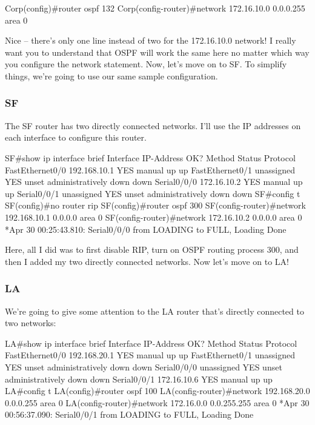 \begin{cli}
Corp(config)#router ospf 132
Corp(config-router)#network 172.16.10.0 0.0.0.255 area 0
\end{cli}

Nice -- there's only one line instead of two for the 172.16.10.0 network!
I really want you to understand that OSPF will work the same here no
matter which way you configure the network statement. Now, let's move on
to SF. To simplify things, we're going to use our same sample
configuration.

\subsubsection{SF}

The SF router has two directly connected networks. I'll use the IP
addresses on each interface to configure this router.

\begin{cli}
SF#show ip interface brief
Interface        IP-Address      OK? Method Status                Protocol
FastEthernet0/0  192.168.10.1    YES manual up                    up
FastEthernet0/1  unassigned      YES unset  administratively down down
Serial0/0/0      172.16.10.2     YES manual up                    up
Serial0/0/1      unassigned      YES unset  administratively down down
SF#config t
SF(config)#no router rip
SF(config)#router ospf 300
SF(config-router)#network 192.168.10.1 0.0.0.0 area 0
SF(config-router)#network 172.16.10.2 0.0.0.0 area 0
*Apr 30 00:25:43.810: %
Serial0/0/0 from LOADING to FULL, Loading Done
\end{cli}

Here, all I did was to first disable RIP, turn on OSPF routing process
300, and then I added my two directly connected networks. Now let's move
on to LA!

\subsubsection{LA}

We're going to give some attention to the LA router that's directly
connected to two networks:

\begin{cli}
LA#show ip interface brief
Interface       IP-Address      OK? Method Status                Protocol
FastEthernet0/0 192.168.20.1    YES manual up                    up
FastEthernet0/1 unassigned      YES unset  administratively down down
Serial0/0/0     unassigned      YES unset  administratively down down
Serial0/0/1     172.16.10.6     YES manual up                    up
LA#config t
LA(config)#router ospf 100
LA(config-router)#network 192.168.20.0 0.0.0.255 area 0
LA(config-router)#network 172.16.0.0 0.0.255.255 area 0
*Apr 30 00:56:37.090: %
Serial0/0/1 from LOADING to FULL, Loading Done
\end{cli}

